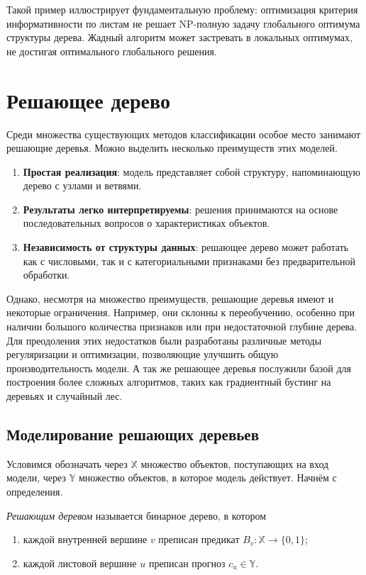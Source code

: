 Такой пример иллюстрирует фундаментальную проблему: оптимизация критерия информативности по листам не решает NP-полную задачу глобального оптимума структуры дерева. Жадный алгоритм может застревать в локальных оптимумах, не достигая оптимального глобального решения.


\section{Решающее дерево}
Среди множества существующих методов классификации особое место занимают решающие деревья.
Можно выделить несколько преимуществ этих моделей.
\begin{enumerate}
    \item \textbf{Простая реализация}: модель представляет собой структуру, напоминающую дерево с узлами и ветвями.
    \item \textbf{Результаты легко интерпретируемы}: решения принимаются на основе последовательных вопросов о характеристиках объектов.
    \item \textbf{Независимость от структуры данных}: решающее дерево может работать как с числовыми, так и с категориальными признаками без предварительной обработки.
          
\end{enumerate}
Однако, несмотря на множество преимуществ, решающие деревья имеют и некоторые ограничения. Например, они склонны к переобучению, особенно при наличии большого количества признаков или при недостаточной глубине дерева.
Для преодоления этих недостатков были разработаны различные методы регуляризации и оптимизации, позволяющие улучшить общую производительность модели. А так же решающее деревья послужили базой для построения более сложных алгоритмов, таких как градиентный бустинг на деревьях и случайный лес.

\subsection{Моделирование решающих деревьев}
Условимся обозначать через $\mathbb{X}$ множество объектов, поступающих на вход модели, через $\mathbb{Y}$ множество объектов, в которое модель действует. Начнём с определения.
\begin{definition}
    \textit{Решающим деревом} называется бинарное дерево, в котором
    \begin{enumerate}
        \item каждой внутренней вершине $v$ преписан предикат $B_v: \mathbb{X} \to \{0, 1\}$;
        \item каждой листовой вершине $u$ преписан прогноз $c_u \in \mathbb{Y}$.
    \end{enumerate}
\end{definition}

